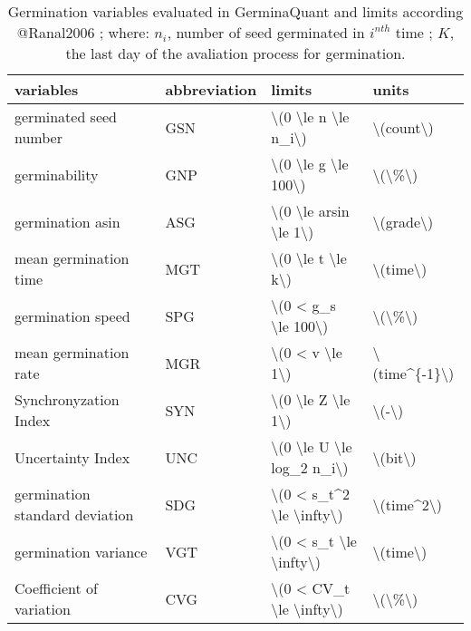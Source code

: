 \documentclass[]{book}
\begin{document}
\begin{table}
\caption{\label{tab:varsum}Germination variables evaluated in GerminaQuant and limits according @Ranal2006 ; where: \(n_i\), number of seed germinated in \(i^{nth}\) time ; \(K\), the last day of the avaliation process for germination.}
\centering
\begin{tabular}[t]{llll}
\toprule
variables & abbreviation & limits & units\\
\midrule
germinated seed number & GSN & \textbackslash{}(0 \textbackslash{}le n \textbackslash{}le n\_i\textbackslash{}) & \textbackslash{}(count\textbackslash{})\\
germinability & GNP & \textbackslash{}(0 \textbackslash{}le g \textbackslash{}le 100\textbackslash{}) & \textbackslash{}(\textbackslash{}\%\textbackslash{})\\
germination asin & ASG & \textbackslash{}(0 \textbackslash{}le arsin \textbackslash{}le 1\textbackslash{}) & \textbackslash{}(grade\textbackslash{})\\
mean germination time & MGT & \textbackslash{}(0 \textbackslash{}le t \textbackslash{}le k\textbackslash{}) & \textbackslash{}(time\textbackslash{})\\
germination speed & SPG & \textbackslash{}(0 < g\_s \textbackslash{}le 100\textbackslash{}) & \textbackslash{}(\textbackslash{}\%\textbackslash{})\\
\addlinespace
mean germination rate & MGR & \textbackslash{}(0 < v \textbackslash{}le 1\textbackslash{}) & \textbackslash{}(time\textasciicircum{}\{-1\}\textbackslash{})\\
Synchronyzation Index & SYN & \textbackslash{}(0 \textbackslash{}le Z \textbackslash{}le 1\textbackslash{}) & \textbackslash{}(-\textbackslash{})\\
Uncertainty Index & UNC & \textbackslash{}(0 \textbackslash{}le U \textbackslash{}le log\_2 n\_i\textbackslash{}) & \textbackslash{}(bit\textbackslash{})\\
germination standard deviation & SDG & \textbackslash{}(0 < s\_t\textasciicircum{}2  \textbackslash{}le \textbackslash{}infty\textbackslash{}) & \textbackslash{}(time\textasciicircum{}2\textbackslash{})\\
germination variance & VGT & \textbackslash{}(0 < s\_t  \textbackslash{}le \textbackslash{}infty\textbackslash{}) & \textbackslash{}(time\textbackslash{})\\
Coefficient of variation & CVG & \textbackslash{}(0 < CV\_t  \textbackslash{}le \textbackslash{}infty\textbackslash{}) & \textbackslash{}(\textbackslash{}\%\textbackslash{})\\
\bottomrule
\end{tabular}
\end{table}
\end{document}
